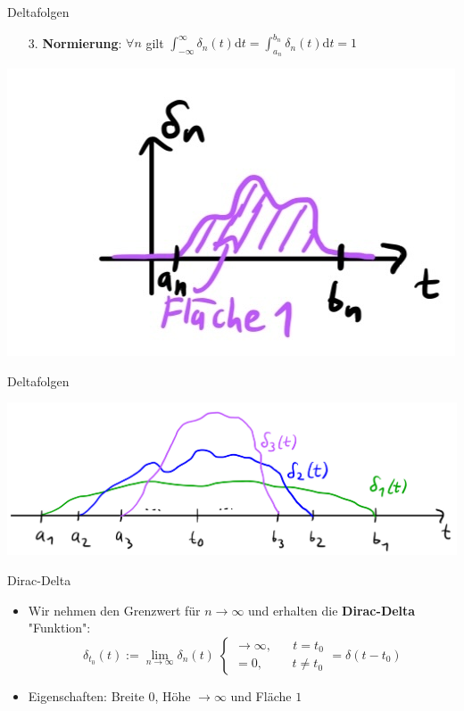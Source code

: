 \documentclass[14pt, aspectratio=169, handout]{beamer}
\begin{document}
\begin{frame}{Deltafolgen}
    \begin{itemize}
        \item[3.]  \textbf{Normierung}: $\forall n$ gilt $\displaystyle\int_{-\infty}^\infty \delta_n(t)\text{d}t = \displaystyle\int_{a_n}^{b_n}\delta_n(t)\text{d}t = 1$
    \end{itemize}
    \begin{center}
        \includegraphics[width=0.4\linewidth]{figures/Deltafolge_5.jpg}
    \end{center}
\end{frame}

\begin{frame}{Deltafolgen}
    \begin{center}
        \includegraphics[width=0.9\linewidth]{figures/Deltafolge_2.jpg}
    \end{center}
\end{frame}

\begin{frame}{Dirac-Delta}
    \begin{itemize}
        \item Wir nehmen den Grenzwert für $n \to \infty$ und erhalten die \textbf{Dirac-Delta} "Funktion":
        $$\delta_{t_0}(t) := \lim_{n \to \infty} \delta_n(t) \; \begin{cases}
        \to \infty, \hspace{20pt} t = t_0\\
        = 0, \hspace{28pt} t \neq t_0
        \end{cases} = \delta(t-t_0)$$
        \item Eigenschaften: Breite $0$, Höhe $\to \infty$ und Fläche $1$
    \end{itemize}
\end{frame}
\end{document}
